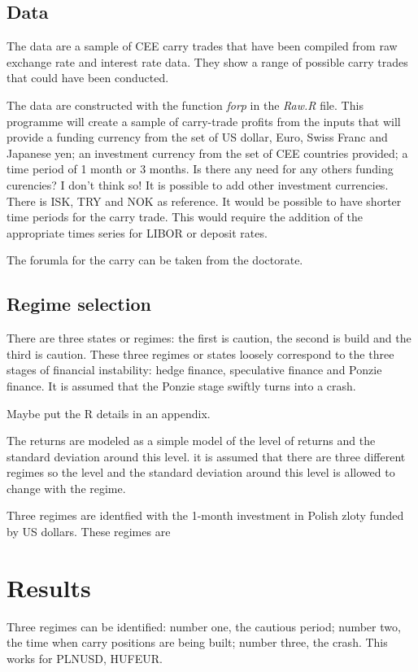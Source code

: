 \documentclass[12pt, a4paper, oneside]{article} %
\begin{document}
\subsection{Data}
The data are a sample of CEE carry trades that have been compiled from raw exchange rate and interest rate data.  They show a range of possible carry trades that could have been conducted. 

The data are constructed with the function \emph{forp} in the \emph{Raw.R} file. This programme will create a sample of carry-trade profits from the inputs that will provide a funding currency from the set of US dollar, Euro, Swiss Franc and Japanese yen; an investment currency from the set of CEE countries provided; a time period of 1 month or 3 months.  Is there any need for any others funding curencies?  I don't think so!   It is possible to add other investment currencies.  There is ISK, TRY and NOK as reference.  It would be possible to have shorter time periods for the carry trade.   This would require the addition of the appropriate times series for LIBOR or deposit rates.  

The forumla for the carry can be taken from the doctorate. 

\subsection{Regime selection}
There are three states or regimes: the first is caution, the second is build and the third is caution. These three regimes or states loosely correspond to the three stages of financial instability: hedge finance, speculative finance and Ponzie finance. It is assumed that the Ponzie stage swiftly turns into a crash. 

Maybe put the R details in an appendix. 

The returns are modeled as a simple model of the level of returns and the standard deviation around this level.  it is assumed that there are three different regimes so the level and the standard deviation around this level is allowed to change with the regime.  

Three regimes are identfied with the 1-month investment in Polish zloty funded by US dollars.  These regimes are 

\section{Results}
Three regimes can be identified: number one, the cautious period; number two, the time when carry positions are being built; number three, the crash.  This works for PLNUSD, HUFEUR. 
\end{document}
